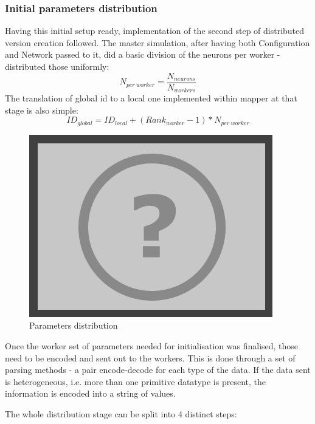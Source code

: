 \subsubsection{Initial parameters distribution}

Having this initial setup ready, implementation of the second step of distributed version creation followed.
The master simulation, after having both Configuration and Network passed to it, did a basic division of the neurons per worker - distributed those uniformly:
\begin{equation}N_{per\ worker} = \frac{N_{neurons}}{N_{workers}}\end{equation}
The translation of global id to a local one implemented within mapper at that stage is also simple:
\begin{equation}ID_{global} = ID_{local} + (Rank_{worker}-1)*N_{per\ worker}\end{equation}

\begin{figure}[h]
\begin{center}
\includegraphics[scale = 0.5]{images/placeholder.png}
\end{center}
\caption{Parameters distribution}
\end{figure}

Once the worker set of parameters needed for initialisation was finalised, those need to be encoded and sent out to the workers. This is done through a set of parsing methods - a pair encode-decode for each type of the data. If the data sent is heterogeneous, i.e. more than one primitive datatype is present, the information is encoded into a string of values.

The whole distribution stage can be split into 4 distinct steps:

